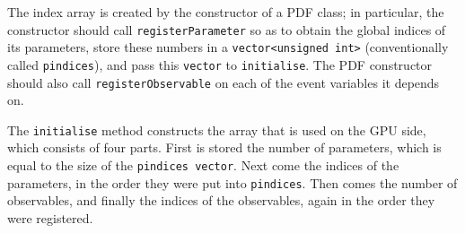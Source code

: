 \documentclass[12pt,pdflatex]{article}
\begin{document}
The index array is created by the constructor of a PDF class; in particular, 
the constructor should call \verb|registerParameter| 
so as to obtain the global indices of its parameters, store these
numbers in a \verb|vector<unsigned int>| (conventionally called \verb|pindices|),
and pass this \verb|vector| to \verb|initialise|. The PDF constructor should
also call \verb|registerObservable| on each of the event variables it depends
on. 

The \verb|initialise| method constructs the array that is used on the GPU side,
which consists of four parts. First is stored the number of parameters,
which is equal to the size of the \verb|pindices vector|. Next come the indices
of the parameters, in the order they were put into \verb|pindices|. Then comes
the number of observables, and finally the indices of the observables, again
in the order they were registered. 
\end{document}
